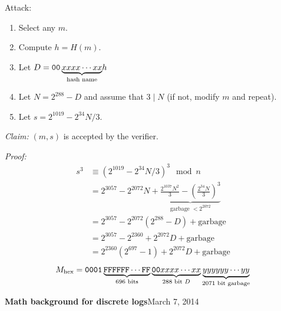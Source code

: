 \documentclass[a4paper,12pt]{article}
\begin{document}
\begin{enumerate}
Attack:
\begin{enumerate}
\item Select any $m$.
\item Compute $h = H(m)$.
\item Let $D = {\tt 00\underbrace{xxxx\cdots xx}_{\text{hash name}}}h$
\item Let $N = 2^{288}-D$ and assume that $3 \mid N$ (if not, modify $m$ and repeat).
\item Let $s = 2^{1019}-2^{34}N/3$.
\end{enumerate}

\emph{Claim:} $(m,s)$ is accepted by the verifier.

\emph{Proof:}
\begin{align*}
s^3 &\equiv (2^{1019}-2^{34}N/3)^3 \mod n  \\
&= 2^{3057}-2^{2072}N+\underbrace{\frac{2^{1037}N^2}3 - \left(\frac{2^{34}N}{3}\right)^3}_{\text{garbage }<2^{2072}} \\
&= 2^{3057} - 2^{2072}(2^{288}-D) + \text{garbage} \\
&= 2^{3057} - 2^{2360} + 2^{2072}D + \text{garbage} \\
&= 2^{2360}(2^{697}-1)+2^{2072}D + \text{garbage}
\end{align*}
\[
M_{\text{hex}} = {\tt 0001}\underbrace{\tt FFFFFF\cdots FF}_{\text{696 bits}}\underbrace{{\tt 00}xxxx\cdots xx}_{\text{288 bit }D} \underbrace{yyyyyy\cdots yy}_{\text{2071 bit garbage}}
\]
\end{enumerate}

\clearpage
{\bf Math background for discrete logs}\hfill March 7, 2014
\end{document}
